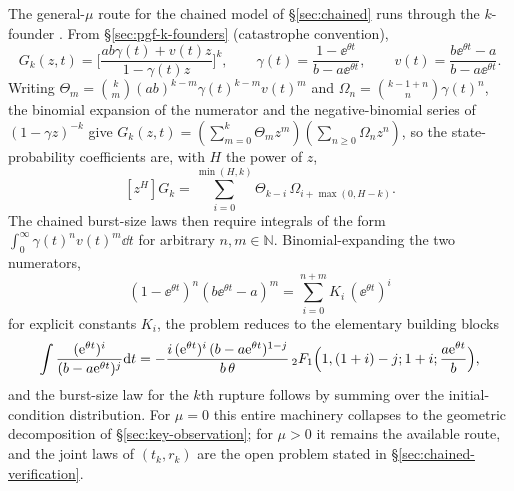 The general-$\mu$ route for the chained model of \S\ref{sec:chained} runs
through the $k$-founder \pgf. From \S\ref{sec:pgf-k-founders} (catastrophe
convention),
$$
G_k(z,t)=\Biggl[\frac{ab\gamma(t)+v(t)z}{1-\gamma(t)z}\Biggr]^k,
\qquad
\gamma(t)=\frac{1-\ee^{\theta t}}{b-a\ee^{\theta t}},
\qquad
v(t)=\frac{b\ee^{\theta t}-a}{b-a\ee^{\theta t}}.
$$
Writing $\Theta_m=\binom{k}{m}(ab)^{k-m}\gamma(t)^{k-m}v(t)^m$ and
$\Omega_n=\binom{k-1+n}{n}\gamma(t)^n$, the binomial expansion of the
numerator and the negative-binomial series of $(1-\gamma z)^{-k}$ give
$G_k(z,t)=(\sum_{m=0}^k\Theta_m z^m)(\sum_{n\ge0}\Omega_n z^n)$, so the
state-probability coefficients are, with $H$ the power of $z$,
$$
[z^H]G_k=
\sum_{i=0}^{\min(H,k)}
\Theta_{k-i}\,\Omega_{i+\max(0,H-k)}.
$$
The chained burst-size laws then require integrals of the form
$\int_0^\infty\gamma(t)^n v(t)^m\dd t$ for arbitrary $n,m\in\mathbb{N}$.
Binomial-expanding the two numerators,
$$
(1-\ee^{\theta t})^n(b\ee^{\theta t}-a)^m
=\sum_{i=0}^{n+m}K_i\,(\ee^{\theta t})^i
$$
for explicit constants $K_i$, the problem reduces to the elementary
building blocks
$$
\int\frac{({\rm e}^{\theta t})^i}{(b-a{\rm e}^{\theta t})^j}{\rm d} t
=-\frac{i\,({\rm e}^{\theta t})^i\,(b-a{\rm e}^{\theta t})^{1-j}}
{b\,\theta}\,
{}_2F_1\Bigl(1,(1+i)-j;1+i;\frac{a{\rm e}^{\theta t}}{b}\Bigr),
$$
and the burst-size law for the $k$th rupture follows by summing over the
initial-condition distribution. For $\mu=0$ this entire machinery collapses
to the geometric decomposition of \S\ref{sec:key-observation}; for $\mu>0$
it remains the available route, and the joint laws of $(t_k,r_k)$ are the
open problem stated in \S\ref{sec:chained-verification}.
